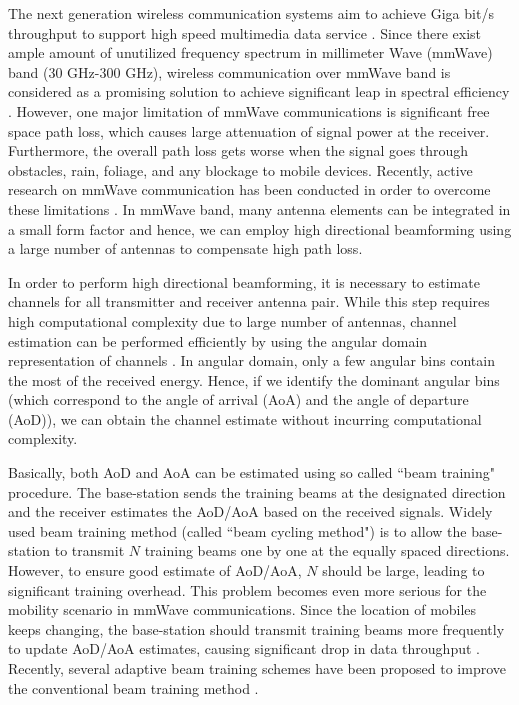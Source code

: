\documentclass[conference]{IEEEtran}
\begin{document}
The next generation wireless communication systems aim to achieve Giga bit/s throughput  to support high speed multimedia data service  \cite{ref:5G_Rappaport,ref:mmWave_Niu}.  Since there exist ample amount of unutilized frequency spectrum in millimeter Wave (mmWave) band (30 GHz-300 GHz), wireless communication over mmWave band  is considered as a promising solution to achieve significant leap in spectral efficiency \cite{ref:mmWave_Pi}.  However, one major limitation of mmWave communications is significant free space path loss, which causes large attenuation of signal power at the receiver.  Furthermore, the overall path loss gets worse when the signal goes through obstacles, rain, foliage, and any blockage to mobile devices.  Recently, active research on mmWave communication has been conducted in order to overcome these limitations \cite{ref:5G_Rappaport,ref:mmWave_Niu,ref:mmWave_Pi,ref:lim_Zhao,ref:lim_Humpleman}. In mmWave band, many antenna elements can be integrated in a small form factor and hence, we can employ high directional beamforming using a large number of antennas to compensate high path loss.

In order to perform high directional beamforming, it is necessary to estimate channels for all transmitter and receiver antenna pair. While this step requires high computational complexity due to large number of antennas, channel estimation can be  performed efficiently by using the angular domain representation of channels \cite{ref:VCM}.
In angular domain, only a few angular bins contain the most of the received energy.
Hence, if we identify the dominant angular bins (which correspond to the angle of arrival (AoA) and the angle of departure (AoD)), we can obtain the channel estimate without incurring computational complexity.

Basically,  both  AoD and AoA can be estimated using so called ``beam training" procedure. The base-station sends the training beams at the designated direction and the receiver estimates the AoD/AoA based on the received signals.  Widely used beam training method (called ``beam cycling method") is to allow the base-station to transmit $N$ training beams one by one at the equally spaced directions.
However,  to ensure good estimate of AoD/AoA,  $N$ should be large, leading to significant  training overhead.  This problem becomes even more serious for the mobility scenario in mmWave communications. Since the location of mobiles keeps changing, the base-station should transmit training beams more frequently to update AoD/AoA estimates, causing significant drop in data throughput  \cite{ref:tracking}.
Recently,  several adaptive beam training schemes have been proposed to improve the conventional beam training method \cite{ref:ad_beam_Ayach,ref:ad_beam_Tsang,ref:ad_beam_Venkateswaran,ref:ad_beam_Wang,ref:ad_beam_Zhang}.
\end{document}
